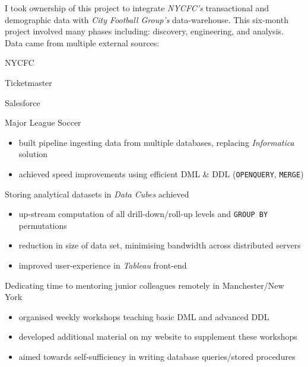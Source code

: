 \documentclass[letterpaper,11pt]{article}
\begin{document}
\begin{description}[style=multiline,leftmargin=3cm]
	\item[New York City FC Project]

	      I took ownership of this project to integrate \textit{NYCFC's} transactional and demographic data with \textit{City Football Group's} data-warehouse. This six-month project involved many phases including: discovery, engineering, and analysis. Data came from multiple external sources:
	      \begin{itemize*}
		      \item NYCFC
		      \item Ticketmaster
		      \item Salesforce
		      \item Major League Soccer
	      \end{itemize*}

	      \begin{description}[style=multiline,leftmargin=2.5cm]
		      \item[Data Pipeline]
		            {
		            \begin{itemize}
			            \item built pipeline ingesting data from multiple databases, replacing \textit{Informatica} solution
			            \item achieved speed improvements using efficient DML \& DDL (\texttt{OPENQUERY}, \texttt{MERGE})
		            \end{itemize}
		            }
		      \item[Data Cubes]
		            Storing analytical datasets in \textit{Data Cubes} achieved
		            \begin{itemize}
			            \item up-stream computation of all drill-down/roll-up levels and \texttt{GROUP BY} permutations
			            \item reduction in size of data set, minimising bandwidth across distributed servers
			            \item improved user-experience in \textit{Tableau} front-end
		            \end{itemize}

		      \item[Mentoring]
		            Dedicating time to mentoring junior colleagues remotely in Manchester/New York
		            \begin{itemize}
			            \item organised weekly workshops teaching basic DML and advanced DDL
			            \item developed additional material on my website to supplement these workshops
			            \item aimed towards self-sufficiency in writing database queries/stored procedures
		            \end{itemize}


\end{description}
\end{description}
\end{document}
